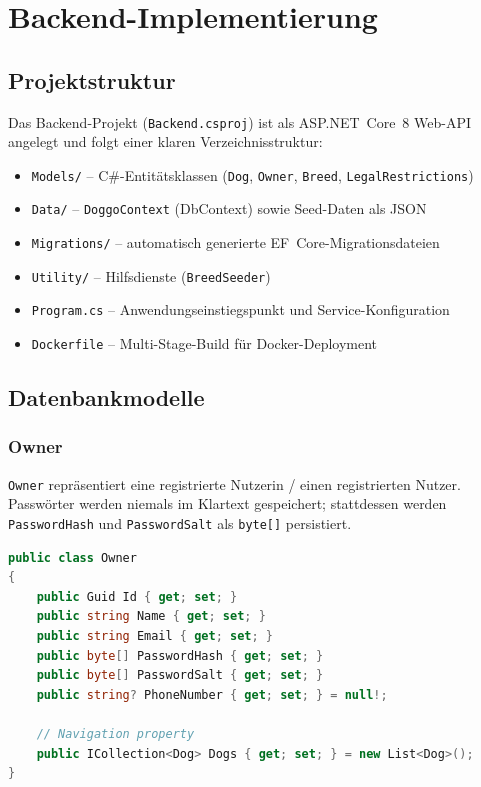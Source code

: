 \chapter{Backend-Implementierung}
\label{chap:backend}

\section{Projektstruktur}
\label{sec:projektstruktur}

Das Backend-Projekt (\texttt{Backend.csproj}) ist als ASP.NET~Core~8 Web-API angelegt und
folgt einer klaren Verzeichnisstruktur:

\begin{itemize}
  \item \texttt{Models/} – C\#-Entitätsklassen (\texttt{Dog}, \texttt{Owner}, \texttt{Breed},
    \texttt{LegalRestrictions})
  \item \texttt{Data/} – \texttt{DoggoContext} (DbContext) sowie Seed-Daten als JSON
  \item \texttt{Migrations/} – automatisch generierte EF~Core-Migrationsdateien
  \item \texttt{Utility/} – Hilfsdienste (\texttt{BreedSeeder})
  \item \texttt{Program.cs} – Anwendungseinstiegspunkt und Service-Konfiguration
  \item \texttt{Dockerfile} – Multi-Stage-Build für Docker-Deployment
\end{itemize}

\section{Datenbankmodelle}
\label{sec:modelle}

\subsection{Owner}
\label{subsec:model-owner}

\texttt{Owner} repräsentiert eine registrierte Nutzerin / einen registrierten Nutzer.
Passwörter werden niemals im Klartext gespeichert; stattdessen werden \texttt{PasswordHash}
und \texttt{PasswordSalt} als \texttt{byte[]} persistiert.

\begin{lstlisting}[language=csharp, caption={Modell Owner.cs}, label=lst:owner, float=htbp]
public class Owner
{
    public Guid Id { get; set; }
    public string Name { get; set; }
    public string Email { get; set; }
    public byte[] PasswordHash { get; set; }
    public byte[] PasswordSalt { get; set; }
    public string? PhoneNumber { get; set; } = null!;

    // Navigation property
    public ICollection<Dog> Dogs { get; set; } = new List<Dog>();
}
\end{lstlisting}

